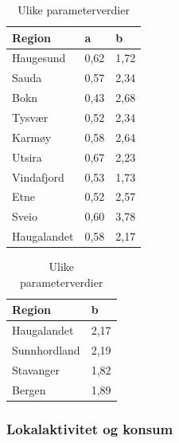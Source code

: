 \documentclass[
]{article}
\begin{document}
\begin{table}

\caption{\label{tbl-a_n_b}Ulike
parameterverdier}\begin{minipage}[t]{0.50\linewidth}

{\centering 

\begin{tabular}[t]{lll}
\toprule
Region & a & b\\
\midrule
Haugesund & 0,62 & 1,72\\
Sauda & 0,57 & 2,34\\
Bokn & 0,43 & 2,68\\
Tysvær & 0,52 & 2,34\\
Karmøy & 0,58 & 2,64\\
Utsira & 0,67 & 2,23\\
Vindafjord & 0,53 & 1,73\\
Etne & 0,52 & 2,57\\
Sveio & 0,60 & 3,78\\
Haugalandet & 0,58 & 2,17\\
\bottomrule
\end{tabular}

}

\end{minipage}%
%
\begin{minipage}[t]{0.50\linewidth}

{\centering 

\begin{tabular}[t]{ll}
\toprule
Region & b\\
\midrule
Haugalandet & 2,17\\
Sunnhordland & 2,19\\
Stavanger & 1,82\\
Bergen & 1,89\\
\bottomrule
\end{tabular}

}

\end{minipage}%

\end{table}

\hypertarget{lokalaktivitet-og-konsum}{%
\subsubsection{Lokalaktivitet og
konsum}\label{lokalaktivitet-og-konsum}}
\end{document}
